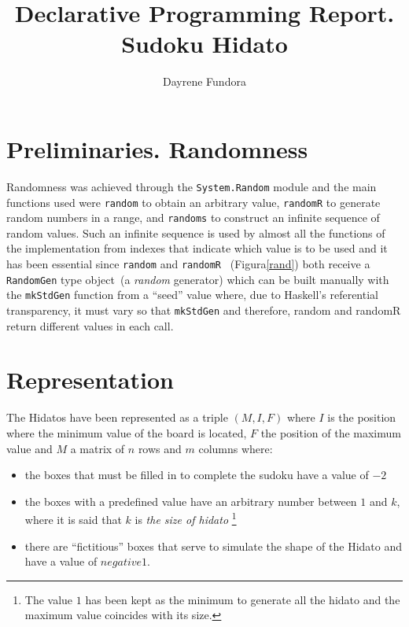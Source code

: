 \documentclass{llncs}
\begin{document}
\title{Declarative Programming Report.\\ Sudoku Hidato}

\author{
  Dayrene Fundora 
  }



\maketitle

\section{Preliminaries. Randomness}
Randomness was achieved through the \texttt{System.Random}\cite{baeza} module and the main functions used were \texttt{random} to obtain an arbitrary value, \texttt{randomR} to generate random numbers in a range, and \texttt{randoms} to construct an infinite sequence of random values. Such an infinite sequence is used by almost all the functions of the implementation from indexes that indicate which value is to be used and it has been essential since \texttt{random} and \texttt{randomR} ~(Figura\ref{rand}) both receive a \texttt{RandomGen} type object~(a \emph{random} generator) which can be built manually with the \texttt{mkStdGen} function from a ``seed''  value where, due to Haskell's referential transparency, it must vary so that \texttt{mkStdGen} and therefore, random and randomR return different values in each call.


\section{Representation}
The Hidatos have been represented as a triple $(M, I, F)$ where $I$ is the position where the minimum value of the board is located, $F$ the position of the maximum value and $M$ a matrix of $n$ rows and $m$ columns where:
\begin{itemize}
\item the boxes that must be filled in to complete the sudoku have a value of $-2$
\item the boxes with a predefined value have an arbitrary number between $1$ and $k$, where it is said that $k$ is \emph{the size of hidato} \footnote{The value $1$ has been kept as the minimum to generate all the hidato and the maximum value coincides with its size.}
\item there are ``fictitious'' boxes that serve to simulate the shape of the Hidato and have a value of $negative 1$.
\end{itemize}
\end{document}
